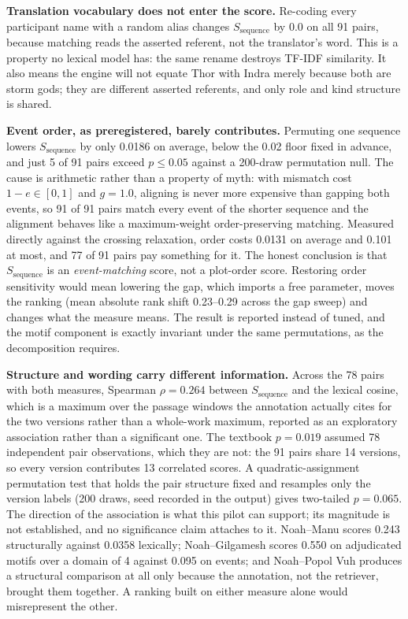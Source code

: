 \documentclass[11pt]{article}
\DeclareRobustCommand{\_}{\textunderscore\allowbreak}
\begin{document}
\textbf{Translation vocabulary does not enter the score.} Re-coding every
participant name with a random alias changes \(S_{\mathrm{sequence}}\) by 0.0 on
all 91 pairs, because matching reads the asserted referent, not the translator's
word. This is a property no lexical model has: the same rename destroys TF-IDF
similarity. It also means the engine will not equate Thor with Indra merely
because both are storm gods; they are different asserted referents, and only role
and kind structure is shared.

\textbf{Event order, as preregistered, barely contributes.} Permuting one
sequence lowers \(S_{\mathrm{sequence}}\) by only 0.0186 on average, below the
0.02 floor fixed in advance, and just 5 of 91 pairs exceed \(p \le 0.05\) against
a 200-draw permutation null. The cause is arithmetic rather than a property of
myth: with mismatch cost \(1-e \in [0,1]\) and \(g = 1.0\), aligning is never more
expensive than gapping both events, so 91 of 91 pairs match every event of the
shorter sequence and the alignment behaves like a maximum-weight order-preserving
matching. Measured directly against the crossing relaxation, order costs 0.0131
on average and 0.101 at most, and 77 of 91 pairs pay something for it. The honest
conclusion is that \(S_{\mathrm{sequence}}\) is an \emph{event-matching} score,
not a plot-order score. Restoring order sensitivity would mean lowering the gap,
which imports a free parameter, moves the ranking (mean absolute rank shift
0.23--0.29 across the gap sweep) and changes what the measure means. The result is
reported instead of tuned, and the motif component is exactly invariant under the
same permutations, as the decomposition requires.

\textbf{Structure and wording carry different information.} Across the 78 pairs
with both measures, Spearman \(\rho = 0.264\) between
\(S_{\mathrm{sequence}}\) and the lexical cosine, which is a maximum over the
passage windows the annotation actually cites for the two versions rather than a
whole-work maximum, reported as an exploratory association rather than a
significant one. The textbook \(p = 0.019\) assumed 78 independent pair
observations, which they are not: the 91 pairs share 14 versions, so every
version contributes 13 correlated scores. A quadratic-assignment permutation test
that holds the pair structure fixed and resamples only the version labels
(200 draws, seed recorded in the output) gives two-tailed \(p = 0.065\). The
direction of the association is what this pilot can support; its magnitude is not
established, and no significance claim attaches to it. Noah--Manu scores 0.243
structurally against 0.0358 lexically; Noah--Gilgamesh scores 0.550 on
adjudicated motifs over a domain of 4 against 0.095 on events; and Noah--Popol
Vuh produces a structural comparison at all only because the annotation, not the
retriever, brought them together. A ranking built on either measure alone would
misrepresent the other.
\end{document}
